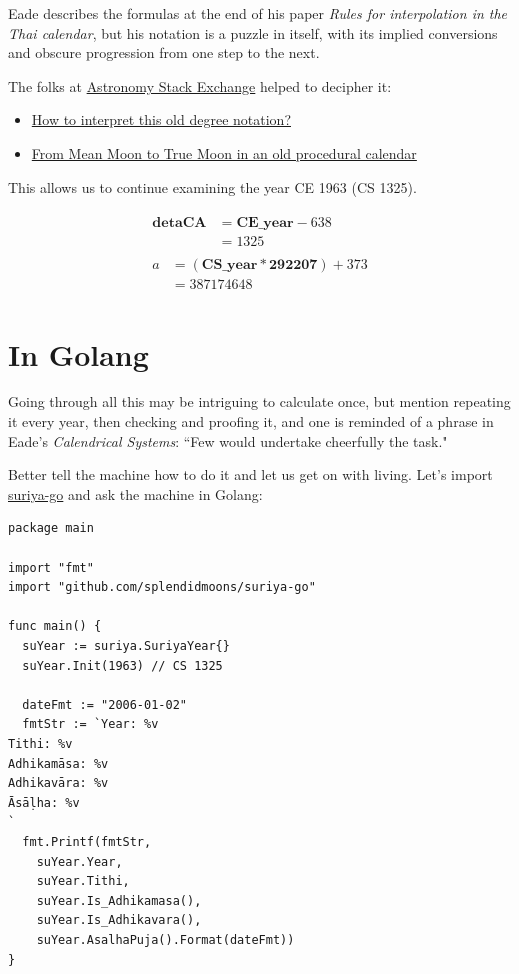 \documentclass[11pt,oneside]{memoir-article}
\begin{document}
Eade describes the formulas at the end of his paper \emph{Rules for interpolation in
the Thai calendar}\cite{eade2000rules}, but his notation is a puzzle in itself,
with its implied conversions and obscure progression from one step to the next.

The folks at \href{http://astronomy.stackexchange.com/}{Astronomy Stack Exchange} helped to decipher it:

\begin{itemize}
\item \href{http://astronomy.stackexchange.com/questions/11753/how-to-interpret-this-old-degree-notation}{How to interpret this old degree notation?}
\item \href{http://astronomy.stackexchange.com/questions/12052/from-mean-moon-to-true-moon-in-an-old-procedural-calendar}{From Mean Moon to True Moon in an old procedural calendar}
\end{itemize}

This allows us to continue examining the year CE 1963 (CS 1325).


\begin{align}
\begin{split}
   \mathbf{detaCA} &= \mathbf{CE\_year} - 638\\
                     &= 1325
\end{split}\\
\begin{split}
                   a &= (\mathbf{CS\_year} * \mathbf{292207}) + 373\\
                     &= 387174648
\end{split}
\end{align}

\section{In Golang}
\label{sec-4-6}
\label{suriya-go-example}

Going through all this may be intriguing to calculate once, but mention
repeating it every year, then checking and proofing it, and one is reminded of a
phrase in Eade's \emph{Calendrical Systems}: ``Few would undertake cheerfully the
task."\cite{eade1995calendrical}

Better tell the machine how to do it and let us get on with living. Let's
import \href{https://github.com/splendidmoons/suriya-go}{suriya-go} and ask the machine in Golang:

\begin{verbatim}
package main

import "fmt"
import "github.com/splendidmoons/suriya-go"

func main() {
  suYear := suriya.SuriyaYear{}
  suYear.Init(1963) // CS 1325

  dateFmt := "2006-01-02"
  fmtStr := `Year: %v
Tithi: %v
Adhikamāsa: %v
Adhikavāra: %v
Āsāḷha: %v
`
  fmt.Printf(fmtStr,
    suYear.Year,
    suYear.Tithi,
    suYear.Is_Adhikamasa(),
    suYear.Is_Adhikavara(),
    suYear.AsalhaPuja().Format(dateFmt))
}
\end{verbatim}
\end{document}
